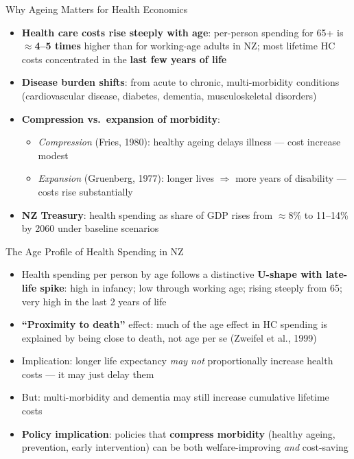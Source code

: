 \documentclass[aspectratio=169, 12pt]{beamer}
\begin{document}
\begin{frame}{Why Ageing Matters for Health Economics}
  \small
  \begin{itemize}
    \item \textbf{Health care costs rise steeply with age}: per-person spending for 65+ is
          $\approx$\textbf{4--5 times} higher than for working-age adults in NZ; most lifetime
          HC costs concentrated in the \textbf{last few years of life}
    \item \textbf{Disease burden shifts}: from acute to chronic, multi-morbidity conditions
          (cardiovascular disease, diabetes, dementia, musculoskeletal disorders)
    \item \textbf{Compression vs.\ expansion of morbidity}:
    \begin{itemize}
      \item \textit{Compression} (Fries, 1980): healthy ageing delays illness --- cost increase modest
      \item \textit{Expansion} (Gruenberg, 1977): longer lives $\Rightarrow$ more years of disability
            --- costs rise substantially
    \end{itemize}
    \item \textbf{NZ Treasury}: health spending as share of GDP rises from $\approx$8\% to
          11--14\% by 2060 under baseline scenarios
  \end{itemize}
\end{frame}

\begin{frame}{The Age Profile of Health Spending in NZ}
  \small
  \begin{itemize}
    \item Health spending per person by age follows a distinctive \textbf{U-shape with late-life spike}:
    high in infancy; low through working age; rising steeply from 65; very high in the last 2 years of life
    \item \textbf{``Proximity to death''} effect: much of the age effect in HC spending is
          explained by being close to death, not age per se (Zweifel et al., 1999)
    \item Implication: longer life expectancy \emph{may not} proportionally increase health costs
          --- it may just delay them
    \item But: multi-morbidity and dementia may still increase cumulative lifetime costs
    \item \textbf{Policy implication}: policies that \textbf{compress morbidity} (healthy ageing,
          prevention, early intervention) can be both welfare-improving \emph{and} cost-saving
  \end{itemize}
\end{frame}
\end{document}
